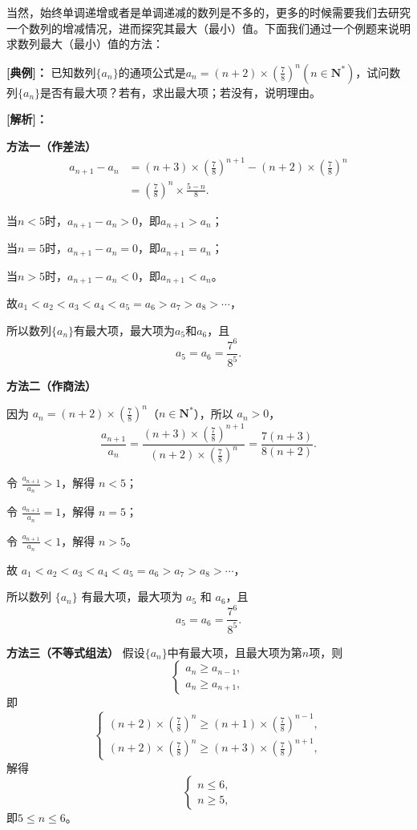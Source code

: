 \documentclass{article}
\begin{document}
 


当然，始终单调递增或者是单调递减的数列是不多的，更多的时候需要我们去研究一个数列的增减情况，进而探究其最大（最小）值。下面我们通过一个例题来说明求数列最大（最小）值的方法：
\vspace{2\baselineskip}

\noindent\textbf{[典例]：} 已知数列$\{a_n\}$的通项公式是$a_n = (n+2)\times\left(\frac{7}{8}\right)^n (n\in \mathbf{N}^*)$，试问数列$\{a_n\}$是否有最大项？若有，求出最大项；若没有，说明理由。

\bigskip

\noindent\textbf{[解析]：} 

\quad \textbf{方法一（作差法）}
\[
\begin{aligned}
a_{n+1} - a_n &= (n+3)\times\left(\frac{7}{8}\right)^{n+1} - (n+2)\times\left(\frac{7}{8}\right)^n \\
&= \left(\frac{7}{8}\right)^n \times \frac{5-n}{8}.
\end{aligned}
\]

当$n < 5$时，$a_{n+1} - a_n > 0$，即$a_{n+1} > a_n$；

当$n = 5$时，$a_{n+1} - a_n = 0$，即$a_{n+1} = a_n$；

当$n > 5$时，$a_{n+1} - a_n < 0$，即$a_{n+1} < a_n$。

故$a_1 < a_2 < a_3 < a_4 < a_5 = a_6 > a_7 > a_8 > \cdots$，

所以数列$\{a_n\}$有最大项，最大项为$a_5$和$a_6$，且
\[
a_5 = a_6 = \frac{7^6}{8^5}.
\]

\quad \noindent\textbf{方法二（作商法）}

因为 \(a_n = (n+2)\times\left(\frac{7}{8}\right)^n\)（\(n\in \mathbf{N}^*\)），所以 \(a_n > 0\)，
\[
\frac{a_{n+1}}{a_n} = \frac{(n+3)\times\left(\frac{7}{8}\right)^{n+1}}{(n+2)\times\left(\frac{7}{8}\right)^n}
= \frac{7(n+3)}{8(n+2)}.
\]

令 \(\frac{a_{n+1}}{a_n} > 1\)，解得 \(n < 5\)；

令 \(\frac{a_{n+1}}{a_n} = 1\)，解得 \(n = 5\)；

令 \(\frac{a_{n+1}}{a_n} < 1\)，解得 \(n > 5\)。

故 \(a_1 < a_2 < a_3 < a_4 < a_5 = a_6 > a_7 > a_8 > \cdots\)，

所以数列 \(\{a_n\}\) 有最大项，最大项为 \(a_5\) 和 \(a_6\)，且
\[
a_5 = a_6 = \frac{7^6}{8^5}.
\]

\quad \noindent\textbf{方法三（不等式组法）}
假设$\{a_n\}$中有最大项，且最大项为第$n$项，则
\[
\begin{cases}
a_n \ge a_{n-1}, \\
a_n \ge a_{n+1},
\end{cases}
\]
即
\[
\begin{cases}
(n+2)\times\left(\frac{7}{8}\right)^n \ge (n+1)\times\left(\frac{7}{8}\right)^{n-1}, \\
(n+2)\times\left(\frac{7}{8}\right)^n \ge (n+3)\times\left(\frac{7}{8}\right)^{n+1},
\end{cases}
\]
解得
\[
\begin{cases}
n \le 6, \\
n \ge 5,
\end{cases}
\]
即$5 \le n \le 6$。
\end{document}
